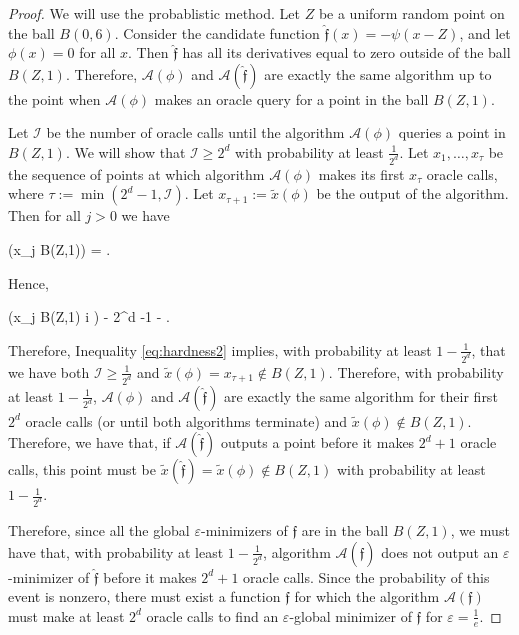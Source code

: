 \documentclass[11pt,letterpaper]{article}
\renewcommand{\epsilon}{\varepsilon}
\def \be{\begin{equs}}
\def \ee{\end{equs}}
\begin{document}
\begin{proof}
%
We will use the probablistic method.  Let $Z$ be a uniform random point on the ball $B(0,6)$. 
%
 Consider the candidate function $\mathfrak{\hat{\mathfrak{f}}}(x) = -\psi(x - Z)$, and let $\phi(x) = 0$ for all $x$. 
  Then $\hat{\mathfrak{f}}$ has all its derivatives equal to zero outside of the ball $B(Z,1)$. 
   Therefore, $\mathcal{A}(\phi)$ and  $\mathcal{A}(\hat{\mathfrak{f}})$ are exactly the same algorithm up to the point when $\mathcal{A}(\phi)$ makes an oracle query for a point in the ball $B(Z,1)$.

Let $\mathcal{I}$ be the number of oracle calls until the algorithm $\mathcal{A}(\phi)$ queries a point in $B(Z,1)$. 
%
 We will show that $\mathcal{I} \geq 2^d$ with probability at least $\frac{1}{2^d}$. 
  Let $x_1,\ldots, x_{\tau}$ be the sequence of points at which algorithm $\mathcal{A}(\phi)$ makes its first $x_{\tau}$ oracle calls, where $\tau := \min(2^d-1, \mathcal{I})$.  Let $x_{\tau+1}:= \tilde{x}(\phi)$ be the output of the algorithm. 
   Then for all $j>0$ we have
\be  \label{eq:hardness1}
(x_j \in B(Z,1)) \leq {}= .
\ee
%
Hence,
%
\be \label{eq:hardness2}
(x_j \notin B(Z,1) \forall i \in [\tau+1] ) - 2^d \times  {} -1 - .
\ee
%
Therefore, Inequality \eqref{eq:hardness2} implies, with probability at least $1-\frac{1}{2^d}$, that we have both $\mathcal{I} \geq \frac{1}{2^d}$ and $\tilde{x}(\phi) = x_{\tau+1} \notin B(Z,1)$. 
%
 Therefore, with probability at least $1-\frac{1}{2^d}$, $\mathcal{A}(\phi)$ and  $\mathcal{A}(\hat{\mathfrak{f}})$ are exactly the same algorithm for their first $2^d$ oracle calls (or until both algorithms terminate) and $\tilde{x}(\phi)\notin B(Z,1)$. 
  Therefore, we have that, if $\mathcal{A}(\hat{\mathfrak{f}})$ outputs a point before it makes $2^d +1$ oracle calls, this point must be $\tilde{x}(\hat{\mathfrak{f}}) = \tilde{x}(\phi) \notin  B(Z,1)$ with probability at least $1-\frac{1}{2^d}$.

Therefore, since all the global $\epsilon$-minimizers of $\mathfrak{f}$ are in the ball $B(Z,1)$, we must have that, with probability at least $1-\frac{1}{2^d}$, algorithm $\mathcal{A}(\hat{\mathfrak{f}})$  does not output an $\epsilon$-minimizer of $\hat{\mathfrak{f}}$ before it makes $2^d +1$ oracle calls.  Since the probability of this event is nonzero, there must exist a function $\mathfrak{f}$ for which the algorithm $\mathcal{A}(\mathfrak{f})$ must make at least $2^d$ oracle calls to find an $\epsilon$-global minimizer of $\mathfrak{f}$ for $\epsilon = \frac{1}{e}$.

\end{proof}
\end{document}
